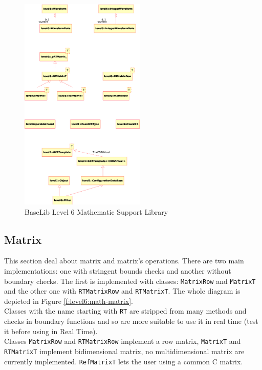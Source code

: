 \begin{figure}[h!]
 \begin{center}
  \includegraphics[width=0.53\textwidth]{level6/level6-math.eps}
  \caption{BaseLib Level 6 Mathematic Support Library}
  \label{f:level6:math}
 \end{center}
\end{figure}



\subsection{Matrix}

This section deal about matrix and matrix's operations. There are two main implementations: one with stringent bounds checks and another without boundary checks. The first is implemented with classes: \texttt{MatrixRow} and \texttt{MatrixT} and the other one with \texttt{RTMatrixRow} and \texttt{RTMatrixT}. The whole diagram is depicted in Figure \ref{f:level6:math-matrix}. \\

Classes with the name starting with \texttt{RT} are stripped from many methods and checks in boundary functions and so are more suitable to use it in real time (test it before using in Real Time). \\

Classes \texttt{MatrixRow} and \texttt{RTMatrixRow} implement a row matrix, \texttt{MatrixT} and \texttt{RTMatrixT} implement bidimensional matrix, no multidimensional matrix are currently implemented. \texttt{RefMatrixT} lets the user using a common C matrix.

